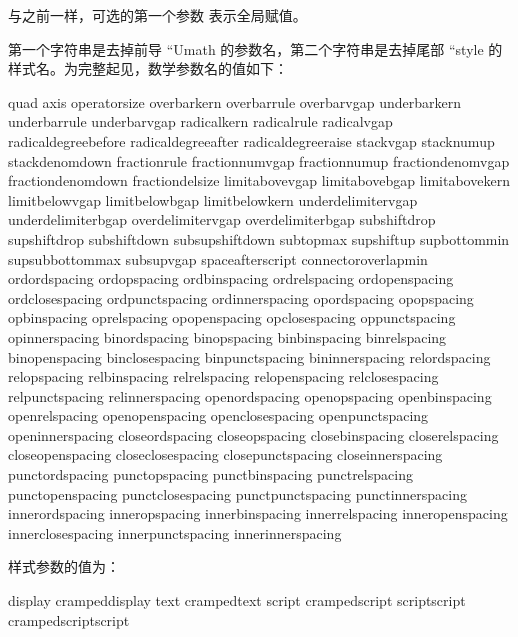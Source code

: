 与之前一样，可选的第一个参数  表示全局赋值。

第一个字符串是去掉前导 ``Umath 的参数名，第二个字符串是去掉尾部
``style 的样式名。为完整起见，数学参数名的值如下：

\begin{typing}
quad                axis                operatorsize
overbarkern         overbarrule         overbarvgap
underbarkern        underbarrule        underbarvgap
radicalkern         radicalrule         radicalvgap
radicaldegreebefore radicaldegreeafter  radicaldegreeraise
stackvgap           stacknumup          stackdenomdown
fractionrule        fractionnumvgap     fractionnumup
fractiondenomvgap   fractiondenomdown   fractiondelsize
limitabovevgap      limitabovebgap      limitabovekern
limitbelowvgap      limitbelowbgap      limitbelowkern
underdelimitervgap  underdelimiterbgap
overdelimitervgap   overdelimiterbgap
subshiftdrop        supshiftdrop        subshiftdown
subsupshiftdown     subtopmax           supshiftup
supbottommin        supsubbottommax     subsupvgap
spaceafterscript    connectoroverlapmin
ordordspacing       ordopspacing        ordbinspacing     ordrelspacing
ordopenspacing      ordclosespacing     ordpunctspacing   ordinnerspacing
opordspacing        opopspacing         opbinspacing      oprelspacing
opopenspacing       opclosespacing      oppunctspacing    opinnerspacing
binordspacing       binopspacing        binbinspacing     binrelspacing
binopenspacing      binclosespacing     binpunctspacing   bininnerspacing
relordspacing       relopspacing        relbinspacing     relrelspacing
relopenspacing      relclosespacing     relpunctspacing   relinnerspacing
openordspacing      openopspacing       openbinspacing    openrelspacing
openopenspacing     openclosespacing    openpunctspacing  openinnerspacing
closeordspacing     closeopspacing      closebinspacing   closerelspacing
closeopenspacing    closeclosespacing   closepunctspacing closeinnerspacing
punctordspacing     punctopspacing      punctbinspacing   punctrelspacing
punctopenspacing    punctclosespacing   punctpunctspacing punctinnerspacing
innerordspacing     inneropspacing      innerbinspacing   innerrelspacing
inneropenspacing    innerclosespacing   innerpunctspacing innerinnerspacing
\end{typing}

样式参数的值为：

\begin{typing}
display       crampeddisplay
text          crampedtext
script        crampedscript
scriptscript  crampedscriptscript
\end{typing}

